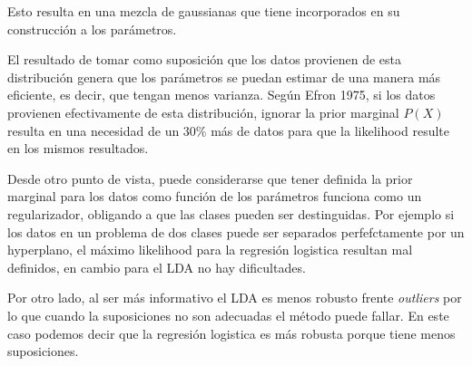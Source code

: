 \documentclass[aps,onecolumn,12pt,notitlepage]{revtex4-1}
\begin{document}
Esto resulta en una mezcla de gaussianas que tiene incorporados en su construcción a los parámetros.

El resultado de tomar como suposición que los datos provienen de esta distribución genera que los parámetros se puedan estimar de una manera más eficiente, es decir, que tengan menos varianza. Según Efron 1975, si los datos provienen efectivamente de esta distribución, ignorar la prior marginal $P(X)$ resulta en una necesidad de un $30\%$ más de datos para que la likelihood resulte en los mismos resultados.

Desde otro punto de vista, puede considerarse que tener definida la prior marginal para los datos como función de los parámetros funciona como un regularizador, obligando a que las clases pueden ser destinguidas. Por ejemplo si los datos en un problema de dos clases puede ser separados perfefctamente por un hyperplano, el máximo likelihood para la regresión logistica resultan mal definidos, en cambio para el LDA no hay dificultades.

Por otro lado, al ser más informativo el LDA es menos robusto frente \textit{outliers} por lo que cuando la suposiciones no son adecuadas el método puede fallar. En este caso podemos decir que la regresión logistica es más robusta porque tiene menos suposiciones.
\end{document}
